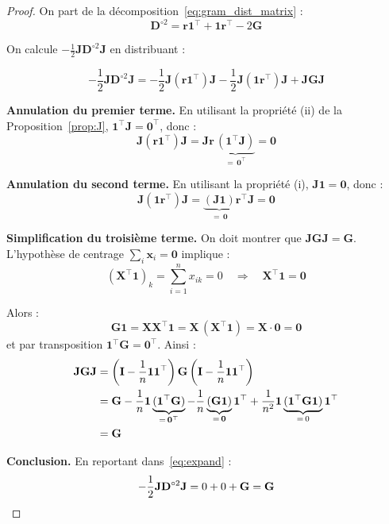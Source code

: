 \documentclass[12pt, a4paper]{article}
\theoremstyle{plain}
\theoremstyle{definition}
\newcommand{\mat}[1]{\mathbf{#1}}
\newcommand{\vect}[1]{\mathbf{#1}}
\newcommand{\ones}{\mathbf{1}}
\newcommand{\Gram}{\mat{G}}
\newcommand{\Dsq}{\mat{D}^{\circ 2}}
\newcommand{\Jmat}{\mat{J}}
\begin{document}
\begin{proof}
    On part de la décomposition~\eqref{eq:gram_dist_matrix} :
    \[
        \Dsq = \vect{r}\ones^\top + \ones\vect{r}^\top - 2\Gram
    \]

    On calcule $-\frac{1}{2}\Jmat\Dsq\Jmat$ en distribuant :

    \begin{equation}
        -\frac{1}{2}\Jmat\Dsq\Jmat
        = -\frac{1}{2}\Jmat\!\left(\vect{r}\ones^\top\right)\!\Jmat
        -\frac{1}{2}\Jmat\!\left(\ones\vect{r}^\top\right)\!\Jmat
        + \Jmat\Gram\Jmat
        \label{eq:expand}
    \end{equation}

    \textbf{Annulation du premier terme.}
    En utilisant la propriété (ii) de la Proposition~\ref{prop:J},
    $\ones^\top\Jmat = \vect{0}^\top$, donc :
    \[
        \Jmat\!\left(\vect{r}\ones^\top\right)\!\Jmat
        = \Jmat\vect{r}\,\underbrace{(\ones^\top\Jmat)}_{=\,\vect{0}^\top}
        = \mat{0}
    \]

    \textbf{Annulation du second terme.}
    En utilisant la propriété (i), $\Jmat\ones = \vect{0}$, donc :
    \[
        \Jmat\!\left(\ones\vect{r}^\top\right)\!\Jmat
        = \underbrace{(\Jmat\ones)}_{=\,\vect{0}}\vect{r}^\top\Jmat
        = \mat{0}
    \]

    \textbf{Simplification du troisième terme.}
    On doit montrer que $\Jmat\Gram\Jmat = \Gram$. L'hypothèse de centrage
    $\sum_i \vect{x}_i = \vect{0}$ implique :
    \[
        (\mat{X}^\top\ones)_k = \sum_{i=1}^n x_{ik} = 0
        \quad\Longrightarrow\quad
        \mat{X}^\top\ones = \vect{0}
    \]

    Alors :
    \[
        \Gram\ones = \mat{X}\mat{X}^\top\ones = \mat{X}\,(\mat{X}^\top\ones)
        = \mat{X}\cdot\vect{0} = \vect{0}
    \]
    et par transposition $\ones^\top\Gram = \vect{0}^\top$. Ainsi :
    \begin{align}
        \Jmat\Gram\Jmat
        &= \left(\mat{I} - \frac{1}{n}\ones\ones^\top\right)\Gram
           \left(\mat{I} - \frac{1}{n}\ones\ones^\top\right) \notag\\
        &= \Gram
           - \frac{1}{n}\ones\underbrace{(\ones^\top\Gram)}_{=\,\vect{0}^\top}
           - \frac{1}{n}\underbrace{(\Gram\ones)}_{=\,\vect{0}}\ones^\top
           + \frac{1}{n^2}\ones\underbrace{(\ones^\top\Gram\ones)}_{=\,0}\ones^\top
        \notag\\
        &= \Gram
    \end{align}

    \textbf{Conclusion.} En reportant dans~\eqref{eq:expand} :
    \[
        -\frac{1}{2}\Jmat\Dsq\Jmat = 0 + 0 + \Gram = \Gram \qedhere
    \]
\end{proof}
\end{document}
